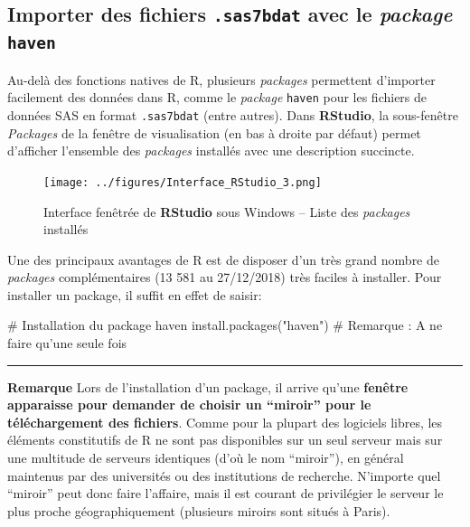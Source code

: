 \documentclass[12pt,twosided, notitlepage]{book}
\newenvironment{Shaded}{}{}
\newcommand{\KeywordTok}[1]{\textcolor[rgb]{0.00,0.00,1.00}{#1}}
\newcommand{\StringTok}[1]{\textcolor[rgb]{0.00,0.50,0.50}{#1}}
\newcommand{\CommentTok}[1]{\textcolor[rgb]{0.00,0.50,0.00}{#1}}
\newcommand{\NormalTok}[1]{#1}
\renewenvironment{Shaded}{\begin{snugshade}}{\end{snugshade}}
\begin{document}
\subsection{\texorpdfstring{Importer des fichiers \texttt{.sas7bdat}
avec le \emph{package}
\texttt{haven}}{Importer des fichiers .sas7bdat avec le package haven}}\label{importer-des-fichiers-.sas7bdat-avec-le-package-haven}

Au-delà des fonctions natives de R, plusieurs \emph{packages} permettent
d'importer facilement des données dans R, comme le \emph{package}
\texttt{haven} pour les fichiers de données SAS en format
\texttt{.sas7bdat} (entre autres). Dans \textbf{RStudio}, la
sous-fenêtre \emph{Packages} de la fenêtre de visualisation (en bas à
droite par défaut) permet d'afficher l'ensemble des \emph{packages}
installés avec une description succincte.

\begin{figure}
\centering
\texttt{[image: ../figures/Interface\_RStudio\_3.png]}
\caption{Interface fenêtrée de \textbf{RStudio} sous Windows -- Liste
des \emph{packages} installés}
\end{figure}

Une des principaux avantages de R est de disposer d'un très grand nombre
de \emph{packages} complémentaires (13 581 au 27/12/2018) très faciles à
installer. Pour installer un package, il suffit en effet de saisir:

\begin{Shaded}
\begin{Highlighting}[]
\CommentTok{# Installation du package haven}
\KeywordTok{install.packages}\NormalTok{(}\StringTok{"haven"}\NormalTok{)}
\CommentTok{# Remarque : A ne faire qu'une seule fois}
\end{Highlighting}
\end{Shaded}

\begin{center}\rule{0.5\linewidth}{\linethickness}\end{center}

\textbf{Remarque} Lors de l'installation d'un package, il arrive qu'une
\textbf{fenêtre apparaisse pour demander de choisir un \enquote{miroir}
pour le téléchargement des fichiers}. Comme pour la plupart des
logiciels libres, les éléments constitutifs de R ne sont pas disponibles
sur un seul serveur mais sur une multitude de serveurs identiques (d'où
le nom \enquote{miroir}), en général maintenus par des universités ou
des institutions de recherche. N'importe quel \enquote{miroir} peut donc
faire l'affaire, mais il est courant de privilégier le serveur le plus
proche géographiquement (plusieurs miroirs sont situés à Paris).
\end{document}
